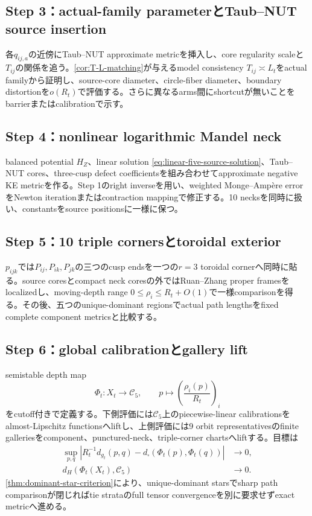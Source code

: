 \documentclass[11pt,a4paper]{ltjsarticle}
\theoremstyle{definition}
\theoremstyle{remark}
\begin{document}
\subsection{Step 3：actual-family parameterとTaub--NUT source insertion}

各$q_{ij,a}$の近傍にTaub--NUT approximate metricを挿入し、core regularity scaleと$T_{ij}$の関係を追う。\cref{cor:T-L-matching}が与えるmodel consistency $T_{ij}\asymp L_t$をactual familyから証明し、source-core diameter、circle-fiber diameter、boundary distortionを$o(R_t)$で評価する。さらに異なるarms間にshortcutが無いことをbarrierまたはcalibrationで示す。

\subsection{Step 4：nonlinear logarithmic Mandel neck}

balanced potential $H_Z$、linear solution \eqref{eq:linear-five-source-solution}、Taub--NUT cores、three-cusp defect coefficientsを組み合わせてapproximate negative KE metricを作る。Step 1のright inverseを用い、weighted Monge--Ampère errorをNewton iterationまたはcontraction mappingで修正する。10 necksを同時に扱い、constantsをsource positionsに一様に保つ。

\subsection{Step 5：10 triple cornersとtoroidal exterior}

$p_{ijk}$では$P_{ij},P_{ik},P_{jk}$の三つのcusp endsを一つの$r=3$ toroidal cornerへ同時に貼る。source coresとcompact neck coresの外ではRuan--Zhang proper framesをlocalizedし、moving-depth range $0\le\rho_i\le R_t+O(1)$で一様comparisonを得る。その後、五つのunique-dominant regionsでactual path lengthsをfixed complete component metricsと比較する。

\subsection{Step 6：global calibrationとgallery lift}

semistable depth map
\[
 \Phi_t:X_t\longrightarrow\mathcal C_5,
 \qquad p\longmapsto \left(\frac{\rho_i(p)}{R_t}\right)_i
\]
をcutoff付きで定義する。下側評価には$\mathcal C_5$上のpiecewise-linear calibrationsをalmost-Lipschitz functionsへliftし、上側評価には9 orbit representativesのfinite galleriesをcomponent、punctured-neck、triple-corner chartsへliftする。目標は
\begin{align}
 \sup_{p,q}\left|R_t^{-1}d_{g_t}(p,q)
 -d_\square(\Phi_t(p),\Phi_t(q))\right|&\to0,\label{eq:distortiongoal-v07}\\
 d_H(\Phi_t(X_t),\mathcal C_5)&\to0.\label{eq:densegoal-v07}
\end{align}
\cref{thm:dominant-star-criterion}により、unique-dominant starsでsharp path comparisonが閉じればtie strataのfull tensor convergenceを別に要求せずexact metricへ進める。
\end{document}
